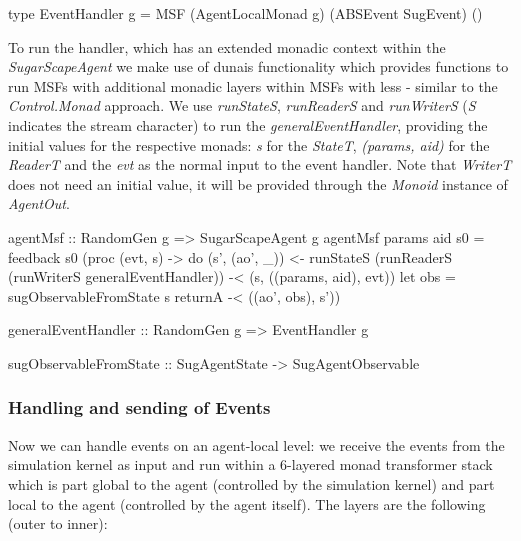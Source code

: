 \begin{HaskellCode}
type EventHandler g = MSF (AgentLocalMonad g) (ABSEvent SugEvent) ()
\end{HaskellCode}

To run the handler, which has an extended monadic context within the \textit{SugarScapeAgent} we make use of dunais functionality which provides functions to run MSFs with additional monadic layers within MSFs with less - similar to the \textit{Control.Monad} approach. We use \textit{runStateS}, \textit{runReaderS} and \textit{runWriterS} (\textit{S} indicates the stream character) to run the \textit{generalEventHandler}, providing the initial values for the respective monads: \textit{s} for the \textit{StateT}, \textit{(params, aid)} for the \textit{ReaderT} and the \textit{evt} as the normal input to the event handler. Note that \textit{WriterT} does not need an initial value, it will be provided through the \textit{Monoid} instance of \textit{AgentOut}.

\begin{HaskellCode}
agentMsf :: RandomGen g => SugarScapeAgent g
agentMsf params aid s0 = feedback s0 (proc (evt, s) -> do
  (s', (ao', _)) <- runStateS (runReaderS (runWriterS generalEventHandler)) -< (s, ((params, aid), evt))
  let obs = sugObservableFromState s
  returnA -< ((ao', obs), s'))

generalEventHandler :: RandomGen g => EventHandler g

sugObservableFromState :: SugAgentState -> SugAgentObservable
\end{HaskellCode}

\subsubsection{Handling and sending of Events}
Now we can handle events on an agent-local level: we receive the events from the simulation kernel as input and run within a 6-layered monad transformer stack which is part global to the agent (controlled by the simulation kernel) and part local to the agent (controlled by the agent itself). The layers are the following (outer to inner):

